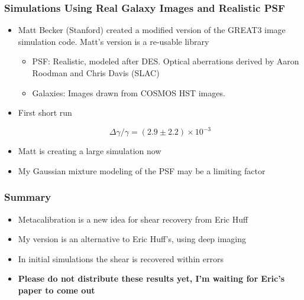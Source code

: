 \documentclass{beamer}
\begin{document}
\frame
{
    \frametitle{Simulations Using Real Galaxy Images and Realistic PSF}

 
    \begin{itemize}

        \item Matt Becker (Stanford) created a modified version of 
            the GREAT3 image simulation code. Matt's version is
            a re-usable library

        \begin{itemize}
            \item {\color{cyan} PSF}: Realistic, modeled after DES.  Optical aberrations derived
                by Aaron Roodman and Chris Davis (SLAC)

            \item {\color{cyan} Galaxies}: Images drawn from COSMOS HST images.
        \end{itemize}

        \item First short run

            {\color{gold}
                \begin{equation}
                    \Delta \gamma/\gamma = (2.9 \pm 2.2) \times 10^{-3} \nonumber
                \end{equation}
            }
        \item Matt is creating a large simulation now

        \item My Gaussian mixture modeling of the PSF may be a limiting
            factor

    \end{itemize}

}

\frame
{
    \frametitle{Summary}

 
    \begin{itemize}
        \item Metacalibration is a new idea for shear recovery from
            Eric Huff

        \item My version is an alternative to Eric Huff's, using
            deep imaging
        
        \item In initial simulations the shear is recovered within errors

        \item {\color{brightred}
                \textbf{
                    Please do not distribute these results yet, I'm waiting for Eric's paper to come out
                }
        }

    \end{itemize}

}
\end{document}
